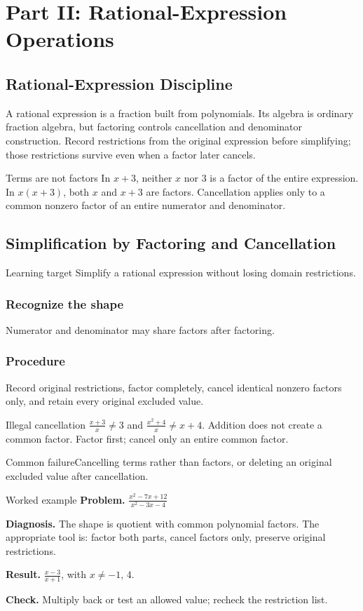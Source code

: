 \documentclass[11pt,oneside]{book}
\begin{document}
\part{Part II: Rational-Expression Operations}
\chapter*{Rational-Expression Discipline}
A rational expression is a fraction built from polynomials. Its algebra is ordinary fraction algebra, but factoring controls cancellation and denominator construction. Record restrictions from the original expression before simplifying; those restrictions survive even when a factor later cancels.
\begin{rulebox}{Terms are not factors}
In $x+3$, neither $x$ nor $3$ is a factor of the entire expression. In $x(x+3)$, both $x$ and $x+3$ are factors. Cancellation applies only to a common nonzero factor of an entire numerator and denominator.
\end{rulebox}
\chapter{Simplification by Factoring and Cancellation}
\begin{rulebox}{Learning target}
Simplify a rational expression without losing domain restrictions.
\end{rulebox}
\section{Recognize the shape}
Numerator and denominator may share factors after factoring.
\section{Procedure}
Record original restrictions, factor completely, cancel identical nonzero factors only, and retain every original excluded value.

\begin{warningbox}{Illegal cancellation}
$\frac{x+3}{x}\ne3$ and $\frac{x^2+4}{x}\ne x+4$. Addition does not create a common factor. Factor first; cancel only an entire common factor.
\end{warningbox}
\begin{warningbox}{Common failure}Cancelling terms rather than factors, or deleting an original excluded value after cancellation.\end{warningbox}
\begin{examplebox}{Worked example}
\textbf{Problem.} $\displaystyle \frac{x^{2} - 7 x + 12}{x^{2} - 3 x - 4}$

\textbf{Diagnosis.} The shape is quotient with common polynomial factors. The appropriate tool is: factor both parts, cancel factors only, preserve original restrictions.

\textbf{Result.} $\displaystyle \frac{x - 3}{x + 1}$, with $x\ne -1,\,4$.

\textbf{Check.} Multiply back or test an allowed value; recheck the restriction list.
\end{examplebox}
\end{document}
